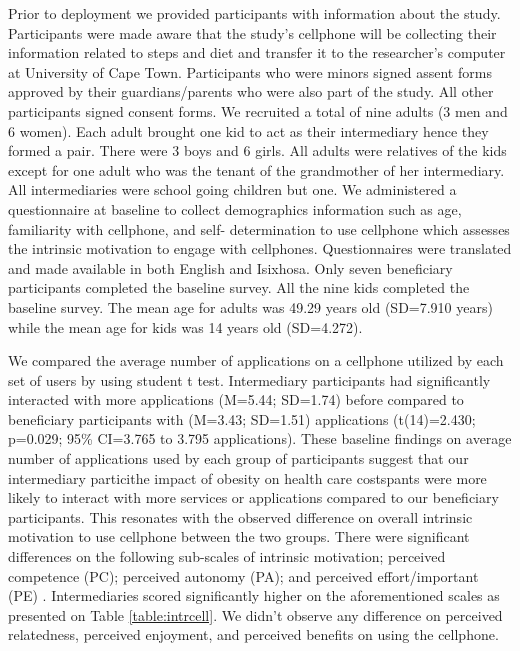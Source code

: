 \documentclass{sig-alternate}
\begin{document}
Prior to deployment we provided participants with information about the study.
Participants were made aware that the study's cellphone will be collecting
their information related to steps and diet and transfer it to the
researcher's computer at University of Cape Town. Participants who were minors
signed assent forms approved by their guardians/parents who were also part of
the study. All other participants signed consent forms.   We recruited a total
of nine adults (3 men and 6 women). Each adult brought one kid to act as their
intermediary hence they formed a pair. There were 3 boys and 6 girls. All
adults were relatives of the kids except for one adult who was the tenant of
the grandmother of her intermediary. All intermediaries were school going
children but one.  We administered a questionnaire at baseline to collect
demographics information such as age, familiarity with cellphone, and self-
determination to use cellphone which assesses the intrinsic motivation to
engage with cellphones. Questionnaires were translated and made available in
both English and Isixhosa. Only seven beneficiary participants completed the
baseline survey. All the nine kids completed the baseline survey. The mean age
for adults was 49.29 years old (SD=7.910 years) while the mean age for kids
was 14 years old (SD=4.272).

We compared the average number of applications on a cellphone utilized by each
set of users by using student t test. Intermediary participants had
significantly interacted with more applications (M=5.44; SD=1.74) before
compared to beneficiary participants with (M=3.43; SD=1.51) applications
(t(14)=2.430; p=0.029; 95\% CI=3.765 to 3.795 applications). These baseline
findings on average number of applications used by each group of participants
suggest that our intermediary particithe impact of obesity on health care
costspants were more likely to interact with more services or applications
compared to our beneficiary participants. This resonates with the observed
difference on overall intrinsic motivation to use cellphone between the two
groups. There were significant differences on the following sub-scales of
intrinsic motivation; perceived competence (PC); perceived autonomy (PA); and
perceived effort/important (PE) . Intermediaries scored significantly higher
on the aforementioned scales as presented on Table \ref{table:intrcell}. We
didn't observe any difference on perceived relatedness, perceived enjoyment,
and perceived benefits on using the cellphone.
\end{document}
